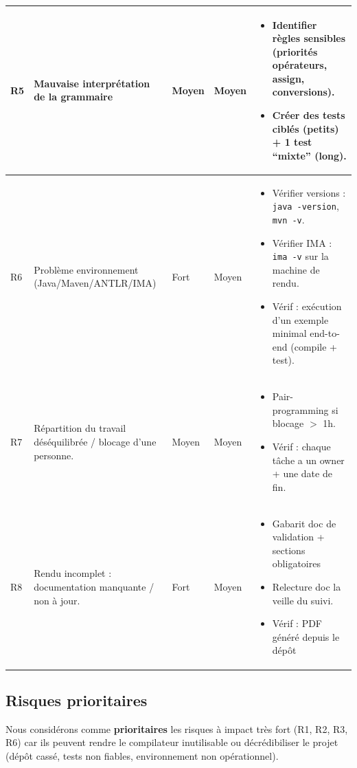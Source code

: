 \documentclass[11pt,a4paper]{article}
\begin{document}
\begin{longtable}{|p{1.4cm}|p{4.1cm}|p{1.6cm}|p{1.9cm}|p{6.2cm}|}
R5 & Mauvaise interprétation de la grammaire  & Moyen & Moyen &
\begin{itemize}[leftmargin=*, nosep]
\item Identifier règles sensibles (priorités opérateurs, assign, conversions).
\item Créer des tests ciblés (petits) + 1 test ``mixte'' (long).
\end{itemize}
\\ \hline

R6 & Problème environnement (Java/Maven/ANTLR/IMA) & Fort & Moyen &
\begin{itemize}[leftmargin=*, nosep]
\item Vérifier versions : \texttt{java -version}, \texttt{mvn -v}.
\item Vérifier IMA : \texttt{ima -v} sur la machine de rendu.
\item Vérif : exécution d'un exemple minimal end-to-end (compile + test).
\end{itemize}
\\ \hline

R7 & Répartition du travail déséquilibrée / blocage d'une personne. & Moyen & Moyen &
\begin{itemize}[leftmargin=*, nosep]
\item Pair-programming si blocage $>$ 1h.
\item Vérif : chaque tâche a un owner + une date de fin.
\end{itemize}
\\ \hline

R8 & Rendu incomplet : documentation manquante / non à jour. & Fort & Moyen &
\begin{itemize}[leftmargin=*, nosep]
\item Gabarit doc de validation + sections obligatoires
\item Relecture doc la veille du suivi.
\item Vérif : PDF généré depuis le dépôt
\end{itemize}
\\ \hline

\end{longtable}

\subsection{Risques prioritaires}
Nous considérons comme \textbf{prioritaires} les risques à impact très fort (R1, R2, R3, R6) car ils peuvent
rendre le compilateur inutilisable ou décrédibiliser le projet (dépôt cassé, tests non fiables, environnement non opérationnel).
\end{document}
